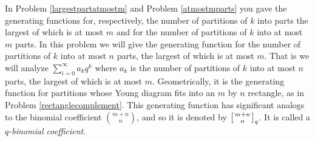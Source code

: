 \itemi In Problem \ref{largestpartatmostm} and Problem \ref{atmostmparts}
you gave the generating functions for, respectively, the number of
partitions of $k$ into parts the largest of which is at most $m$ and for
the number of partitions of $k$ into at most $m$ parts.  In this problem
we will give the generating function for the number of partitions of $k$
into at most $n$ parts, the largest of which is at most $m$.  That is we
will analyze $\sum_{i=0}^\infty a_kq^k$ where $a_k$ is the number of
partitions of $k$ into at most $n$ parts, the largest of which is at most
$m$.  Geometrically, it is the generating function for partitions whose
Young diagram fits into an $m$ by $n$ rectangle, as in Problem
\ref{rectanglecomplement}.  This generating function has significant
analogs to the binomial coefficient
$m+n\choose n$, and so it is denoted by $\left[{m+n\atop n}\right]_q$.  It is called
a {\em $q$-binomial coefficient}.
